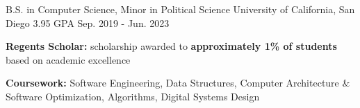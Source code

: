 

\begin{cventries}

    \cventry
    {B.S. in Computer Science, Minor in Political Science} %
    {University of California, San Diego} %
    {3.95 GPA} %
    {Sep. 2019 - Jun. 2023} %
    {
      \begin{cvitems} %
        \item {\textbf{Regents Scholar:} scholarship awarded to \textbf{approximately 1\% of students} based on academic excellence}
        \item {\textbf{Coursework:} Software Engineering, Data Structures, Computer Architecture \& Software Optimization, Algorithms, Digital Systems Design}
      \end{cvitems}
    }

\end{cventries}
